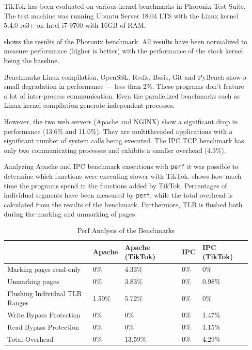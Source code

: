 TikTok has been evaluated on various kernel benchmarks in Phoronix
Test Suite\cite{phoronix}. The test machine was running Ubuntu Server 18.04 LTS
with the Linux kernel 5.4.0-rc3+ on Intel i7-9700 with 16GB of RAM.

 shows the results of the Phoronix benchmark. All
results have been normalized to measure performance (higher is better) with the
performance of the stock kernel being the baseline.

Benchmarks Linux compilation, OpenSSL, Redis, Basis, Git and PyBench show a
small degradation in performance --- less than 2\%. These programs don't feature
a lot of inter-process communication. Even the parallelized benchmarks such as
Linux kernel compilation generate independent processes.

However, the two web servers (Apache and NGINX) show a significant drop in
performance (13.6\% and 11.0\%). They are multithreaded applications with a
significant number of system calls being executed. The IPC TCP benchmark has
only two communicating processes and exhibits a smaller overhead (4.3\%).

Analyzing Apache and IPC benchmark executions with \texttt{perf} it was possible
to determine which functions were executing slower with TikTok.
 shows how much time the programs spend in the functions added
by TikTok. Percentages of individual segments have been measured by
\texttt{perf}, while the total overhead is calculated from the results of the
benchmark. Furthermore, TLB is flushed both during the marking and unmarking of
pages.

\begin{table}[]
  \label{table:perf}
  \centering
  \begin{tabular}{|l|l|l|l|l|}
  \hline
                                 & Apache & Apache (TikTok) & IPC & IPC (TikTok)\\ \hline
  Marking pages read-only        & 0\%    & 4.33\%          & 0\% & 0\%         \\ \hline
  Unmarking pages                & 0\%    & 3.83\%          & 0\% & 0.98\%      \\ \hline
  Flushing Individual TLB Ranges & 1.50\% & 5.72\%          & 0\% & 0\%         \\ \hline
  Write Bypass Protection        & 0\%    & 0\%             & 0\% & 1.47\%      \\ \hline
  Read Bypass Protection         & 0\%    & 0\%             & 0\% & 1.15\%      \\ \hline
  Total Overhead                 & 0\%    & 13.59\%         & 0\% & 4.29\%      \\ \hline
  \end{tabular}
  \caption{Perf Analysis of the Benchmarks}
\end{table}


